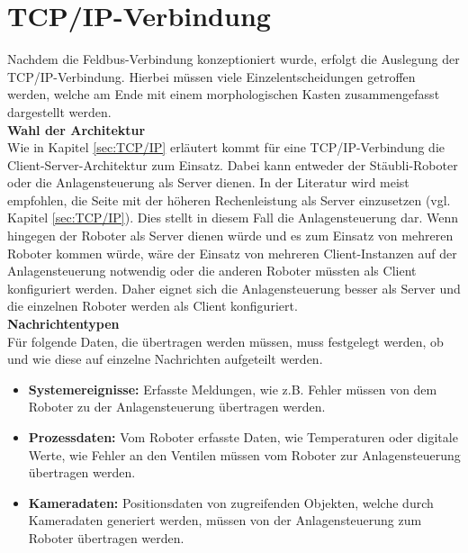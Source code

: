 \documentclass[ a4paper,
                oneside,
                toc=bibliography,
                toc=listof
                ]{scrbook}
\begin{document}
	\section{TCP/IP-Verbindung}
	Nachdem die Feldbus-Verbindung konzeptioniert wurde, erfolgt die Auslegung der TCP/IP-Verbindung. Hierbei müssen viele Einzelentscheidungen getroffen werden, welche am Ende mit einem morphologischen Kasten zusammengefasst dargestellt werden.\\
	\textbf{Wahl der Architektur} \\
	Wie in Kapitel \ref{sec:TCP/IP} erläutert kommt für eine TCP/IP-Verbindung die Client-Server-Architektur zum Einsatz. Dabei kann entweder der Stäubli-Roboter oder die Anlagensteuerung als Server dienen. In der Literatur wird meist empfohlen, die Seite mit der höheren Rechenleistung als Server einzusetzen (vgl. Kapitel \ref{sec:TCP/IP}). Dies stellt in diesem Fall die Anlagensteuerung dar. Wenn hingegen der Roboter als Server dienen würde und es zum Einsatz von mehreren Roboter kommen würde, wäre der Einsatz von mehreren Client-Instanzen auf der Anlagensteuerung notwendig oder die anderen Roboter müssten als Client konfiguriert werden. Daher eignet sich die Anlagensteuerung besser als Server und die einzelnen Roboter werden als Client konfiguriert. \\
	\textbf{Nachrichtentypen}\\
	Für folgende Daten, die übertragen werden müssen, muss festgelegt werden, ob und wie diese auf einzelne Nachrichten aufgeteilt werden.
	\begin{itemize}
		\item \textbf{Systemereignisse: } Erfasste Meldungen, wie z.B. Fehler müssen von dem Roboter zu der Anlagensteuerung übertragen werden.
		\item \textbf{Prozessdaten: } Vom Roboter erfasste Daten, wie Temperaturen oder digitale Werte, wie Fehler an den Ventilen müssen vom Roboter zur Anlagensteuerung übertragen werden.
		\item \textbf{Kameradaten:} Positionsdaten von zugreifenden Objekten, welche durch Kameradaten generiert werden, müssen von der Anlagensteuerung zum Roboter übertragen werden.\\
	\end{itemize}
\end{document}
